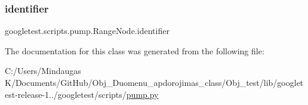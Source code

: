\subsubsection{\texorpdfstring{identifier}{identifier}}
{\footnotesize\ttfamily googletest.\+scripts.\+pump.\+Range\+Node.\+identifier}



The documentation for this class was generated from the following file\+:\begin{DoxyCompactItemize}
\item 
C\+:/\+Users/\+Mindaugas K/\+Documents/\+Git\+Hub/\+Obj\+\_\+\+Duomenu\+\_\+apdorojimas\+\_\+class/\+Obj\+\_\+test/lib/googletest-\/release-\/1../googletest/scripts/\mbox{\hyperlink{_obj__test_2lib_2googletest-release-1_88_81_2googletest_2scripts_2pump_8py}{pump.\+py}}\end{DoxyCompactItemize}
